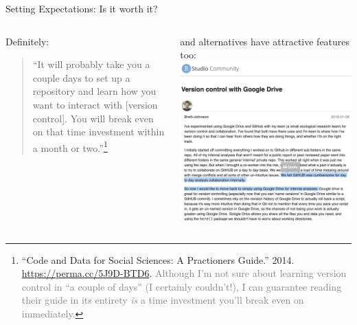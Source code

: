\documentclass[ignorenonframetext,notes, 10pt, aspectratio=169]{beamer}
\begin{document}
\begin{frame}{Setting Expectations: Is it worth it?}
\begin{columns}[T]
\begin{column}{0.5\textwidth}
\begin{minipage}[t]{\linewidth}

Definitely:\\

\begin{quote}
``It will probably take you a couple days to set up a repository and learn how you want to interact with [version control]. You will break even on that time investment within a month or two.''\footnote{\scriptsize ``Code and Data for Social Sciences: A Practioners Guide.'' 2014. \url{https://perma.cc/5J9D-BTD6}.  \textcolor{gray}{Although I'm not sure about learning version control in ``a couple of days'' (I certainly couldn't!), I can guarantee reading their guide in its entirety \emph{is} a time investment you'll break even on immediately.}}\\
\end{quote}

\end{minipage}
\bigskip
\bigskip
\vspace*{\fill}

\end{column}
\begin{column}{0.5\textwidth}
\begin{minipage}[t]{\linewidth}
and alternatives have attractive features too:
\smallskip
\centering
\includegraphics[width = 0.8\linewidth]{github_vs_gdrive.png}
\end{minipage}
\end{column}
\end{columns}
\end{frame}
\end{document}
